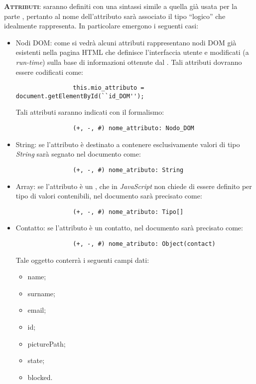 \begin{description}
	\item{\scshape\bfseries Attributi}: saranno definiti con una sintassi simile a quella già usata per la parte , pertanto al nome dell'attributo sarà associato il tipo ``logico'' che idealmente rappresenta. In particolare emergono i seguenti casi:
		\begin{itemize}
			\item Nodi DOM: come si vedrà alcuni attributi rappresentano nodi DOM già esistenti nella pagina HTML che definisce l'interfaccia utente e modificati (a \textit{run-time}) sulla base di informazioni ottenute dal . Tali attributi dovranno essere codificati come:
			
			\begin{verbatim}
				this.mio_attributo = document.getElementById(``id_DOM'');
			\end{verbatim}
			
			Tali attributi saranno indicati con il formalismo:
			
			\begin{verbatim}
				(+, -, #) nome_attributo: Nodo_DOM
			\end{verbatim}
			
			\item String: se l'attributo è destinato a contenere esclusivamente valori di tipo \textit{String} sarà segnato nel documento come:
			
			\begin{verbatim}
				(+, -, #) nome_atributo: String
			\end{verbatim}
			
			\item Array: se l'attributo è un , che in \textit{JavaScript} non chiede di essere definito per tipo di valori contenibili, nel documento sarà precisato come:
			
			\begin{verbatim}
				(+, -, #) nome_atributo: Tipo[]
			\end{verbatim}
			
			\item Contatto: se l'attributo è un contatto, nel documento sarà precisato come:
			
			\begin{verbatim}
				(+, -, #) nome_atributo: Object(contact)
			\end{verbatim}
			Tale oggetto conterrà i seguenti campi dati:
			\begin{itemize}
			\item name;
			\item surname;
			\item email;
			\item id;
			\item picturePath;
			\item state;
			\item blocked.
			\end{itemize}


\end{itemize}
\end{description}
